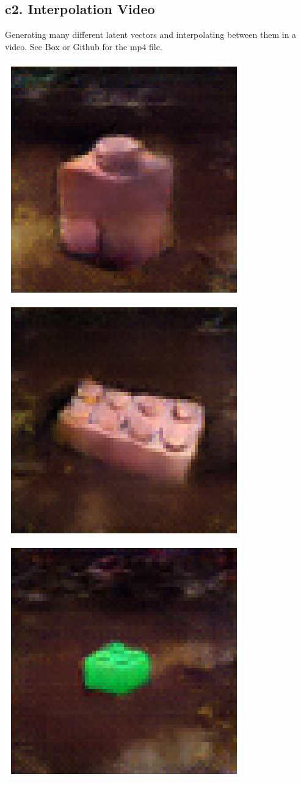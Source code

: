 \documentclass[]{article}
\begin{document}
\subsection*{c2. Interpolation Video}
Generating many different latent vectors and interpolating between them in a video. See Box or Github for the mp4 file.
\begin{center}
\includegraphics[scale=0.25]{./imgs/f1}
\includegraphics[scale=0.25]{./imgs/f2}
\includegraphics[scale=0.25]{./imgs/f3}

\end{center}
\end{document}
